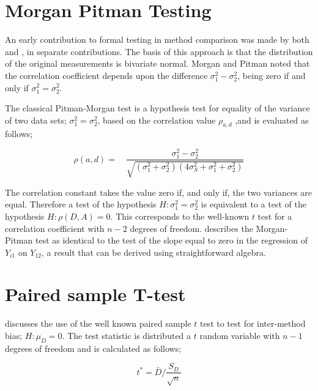 \documentclass[12pt, a4paper]{report}
\theoremstyle{plain}
\theoremstyle{definition}
\theoremstyle{remark}
\begin{document}
	

	\section{Morgan Pitman Testing}
	An early contribution to formal testing in method comparison was
	made by both \citet{morgan} and \citet{pitman}, in separate
	contributions. The basis of this approach is that the
	distribution of the original measurements is bivariate normal.
	Morgan and Pitman noted that the correlation coefficient depends
	upon the difference $\sigma^{2}_{1}- \sigma^{2}_{2}$, being zero
	if and only if $\sigma^{2}_{1}=\sigma^{2}_{2}$.
	
	The classical Pitman-Morgan test is a hypothesis test for equality
	of the variance of two data sets; $\sigma^{2}_{1} =
	\sigma^{2}_{2}$, based on the correlation value $\rho_{a,d}$ ,and
	is evaluated as follows;
	
	\begin{equation}
	\rho(a,d)=\quad\frac{\sigma^{2}_{1}-\sigma^{2}_{2}}{\sqrt{(\sigma^{2}_{1}+\sigma^{2}_{2})(4\sigma^{2}_{S}+\sigma^{2}_{1}+\sigma^{2}_{2})}}
	\end{equation}
	
	The correlation constant takes the value zero if, and only if, the two variances are equal. Therefore a test of the hypothesis $H: \sigma^{2}_{1}=\sigma^{2}_{2}$ is equivalent to a test of the hypothesis $H: \rho(D,A) = 0$. This corresponds to the well-known
	$t$ test for a correlation coefficient with $n-2$ degrees of freedom. \citet{Bartko} describes the Morgan-Pitman test as identical to
	the test of the slope equal to zero in the regression of $Y_{i1}$ on $Y_{12}$, a result that can be derived using
	straightforward algebra.
	
	

	
	
	
	
	\section{Paired sample T-test} \citet{Bartko} discusses the use
	of the well known paired sample $t$ test to test for inter-method
	bias; $H: \mu_{D}=0$. The test statistic is distributed a $t$
	random variable with $n-1$ degrees of freedom and is calculated as
	follows;
	
	\begin{equation}
	t^{*} = \bar{D}/ \frac{S_{D}}{\sqrt{n}}
	\end{equation}
	
\end{document}
